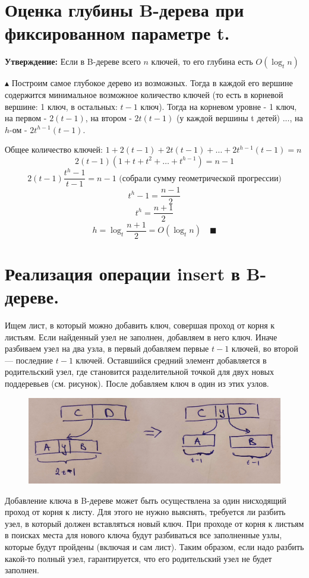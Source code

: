 \section{Оценка глубины B-дерева при фиксированном параметре t.}
\par \textbf{Утверждение:} Если в B-дереве всего $n$ ключей, то его глубина есть $O(\log_t n)$
\par $\blacktriangle$ Построим самое глубокое дерево из возможных. Тогда в каждой его вершине содержится минимальное возможное количество ключей (то есть в корневой вершине: 1 ключ, в остальных: $t-1$ ключ). Тогда на корневом уровне - 1 ключ, на первом - $2(t-1)$, на втором - $2t(t-1)$ (у каждой вершины t детей) ..., на $h$-ом - $2t^{h-1}(t-1)$.
\par Общее количество ключей: $1+2(t-1)+2t(t-1)+\ldots+2t^{h-1}(t-1)=n$
$$2(t-1)(1+t+t^2+\ldots+t^{h-1})=n-1$$
$$2(t-1)\frac{t^h-1}{t-1}=n-1 \text{ (собрали сумму геометрической прогрессии)}$$
$$t^h-1=\frac{n-1}{2}$$
$$t^h=\frac{n+1}{2}$$
$$h=\log_t \frac{n+1}{2}=O(\log_t n) \quad \blacksquare$$
\setcounter{section}{52}
\section{Реализация операции insert в B-дереве.}
\par Ищем лист, в который можно добавить ключ, совершая проход от корня к листьям. Если найденный узел не заполнен, добавляем в него ключ. Иначе разбиваем узел на два узла, в первый добавляем первые $t - 1$ ключей, во второй — последние $t - 1$ ключей. Оставшийся средний элемент добавляется в родительский узел, где становится разделительной точкой для двух новых поддеревьев (см. рисунок). После добавляем ключ в один из этих узлов.
\begin{figure}[h]
    \centering
    \includegraphics[scale=0.1]{images/51-54_b split.jpg}
\end{figure}
\par Добавление ключа в B-дереве может быть осуществлена за один нисходящий проход от корня к листу. Для этого не нужно выяснять, требуется ли разбить узел, в который должен вставляться новый ключ. При проходе от корня к листьям в поисках места для нового ключа будут разбиваться все заполненные узлы, которые будут пройдены (включая и сам лист). Таким образом, если надо разбить какой-то полный узел, гарантируется, что его родительский узел не будет заполнен.
\\

